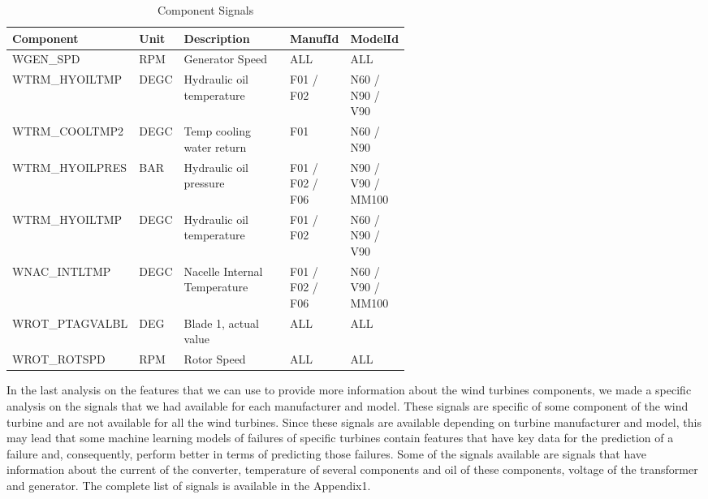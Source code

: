 %

\begin{table}[!ht]
    \centering
    \begin{tabular}{|l|l|p{0.27\linewidth}|p{0.15\linewidth}|p{0.15\linewidth}|}
    \hline
        Component & Unit & Description & ManufId & ModelId \\ \hline
        WGEN\_SPD & RPM & Generator Speed & ALL & ALL \\ \hline
        WTRM\_HYOILTMP & DEGC & Hydraulic oil temperature & F01 / F02 & N60 / N90 / V90 \\ \hline
        WTRM\_COOLTMP2 & DEGC & Temp cooling water return & F01 & N60 / N90 \\ \hline
        WTRM\_HYOILPRES & BAR & Hydraulic oil pressure & F01 / F02 / F06 & N90 / V90 / MM100 \\ \hline
        WTRM\_HYOILTMP & DEGC & Hydraulic oil temperature & F01 / F02 & N60 / N90 / V90 \\ \hline
        WNAC\_INTLTMP & DEGC & Nacelle Internal Temperature & F01 / F02 / F06 & N60 / V90 / MM100 \\ \hline
        WROT\_PTAGVALBL & DEG & Blade 1, actual value & ALL & ALL \\ \hline
        WROT\_ROTSPD & RPM & Rotor Speed & ALL & ALL \\ \hline
    \end{tabular}
    \caption{Component Signals}
    \label{ComponentSignals}
\end{table}

In the last analysis on the features that we can use to provide more information about the wind turbines components, we made a specific analysis on the signals that we had available for each manufacturer and model. These signals are specific of some component of the wind turbine and are not available for all the wind turbines.
Since these signals are available depending on turbine manufacturer and model, this may lead that some machine learning models of failures of specific turbines contain features that have key data for the prediction of a failure and, consequently, perform better in terms of predicting those failures.
Some of the signals available are signals that have information about the current of the converter, temperature of several components and oil of these components, voltage of the transformer and generator. The complete list of signals is available in the Appendix1.

